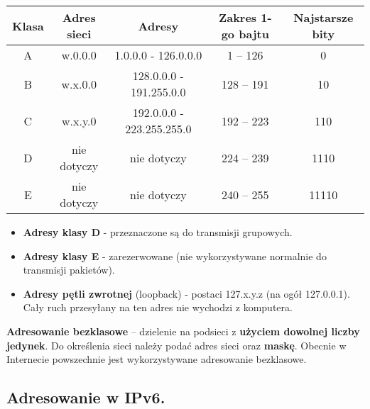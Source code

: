 \documentclass[main.tex]{subfiles}
\begin{document}
    \begin{table}[H]
        \begin{center}
            \begin{tabular}{|c|c|c|c|c|}
                \hline
                Klasa & Adres sieci & Adresy & Zakres 1-go bajtu & Najstarsze bity\\
                \hline
                A & w.0.0.0 & 1.0.0.0 - 126.0.0.0 & 1 – 126 & 0\\
                \hline
                B & w.x.0.0 & 128.0.0.0 - 191.255.0.0 & 128 – 191 & 10\\
                \hline
                C & w.x.y.0 & 192.0.0.0 - 223.255.255.0 & 192 – 223 & 110\\
                \hline
                D & nie dotyczy & nie dotyczy & 224 – 239 & 1110\\
                \hline
                E & nie dotyczy & nie dotyczy & 240 – 255 & 11110\\
                \hline
            \end{tabular}
        \end{center}
    \end{table}

    \begin{itemize}[noitemsep]
        \item \textbf{Adresy klasy D} - przeznaczone są do transmisji grupowych.
        \item \textbf{Adresy klasy E} - zarezerwowane (nie wykorzystywane normalnie do transmisji pakietów).
        \item \textbf{Adresy pętli zwrotnej} (loopback) - postaci 127.x.y.z (na ogół 127.0.0.1). Cały ruch przesyłany na ten adres nie wychodzi z komputera.
    \end{itemize}


    \noindent \textbf{Adresowanie bezklasowe} -- dzielenie na podsieci z \textbf{użyciem dowolnej liczby jedynek}.
    Do określenia sieci należy podać adres sieci oraz \textbf{maskę}.
    Obecnie w Internecie powszechnie jest wykorzystywane adresowanie bezklasowe.

    \subsection{Adresowanie w IPv6.}
\end{document}
